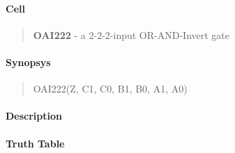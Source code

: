 \label{OAI222}
\paragraph{Cell}
\begin{quote}
    \textbf{OAI222} - a 2-2-2-input OR-AND-Invert gate
\end{quote}

\paragraph{Synopsys}
\begin{quote}
    OAI222(Z, C1, C0, B1, B0, A1, A0)
\end{quote}

\paragraph{Description}



\paragraph{Truth Table}


